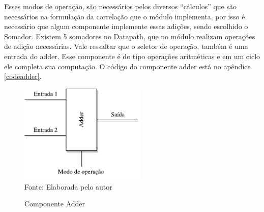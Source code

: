 Esses modos de operação, são necessários pelos diversos “cálculos” que são necessários na formulação da correlação que o módulo implementa, por isso  é necessário que algum componente implemente essas adições, sendo escolhido o Somador.
Existem 5 somadores no Datapath, que no módulo realizam operações de adição necessárias. Vale ressaltar que o seletor de operação, também é uma entrada do adder. Esse componente é do tipo operações aritméticas e em um ciclo ele completa sua computação. O código do componente adder está no apêndice \ref{codeadder}.

\begin{figure}[H]
	\centering
	\caption{Componente Adder}
	\includegraphics[width=6cm]{figures/Adder.pdf}\\
	
	{Fonte: Elaborada pelo autor}
	\label{adder}
\end{figure}

